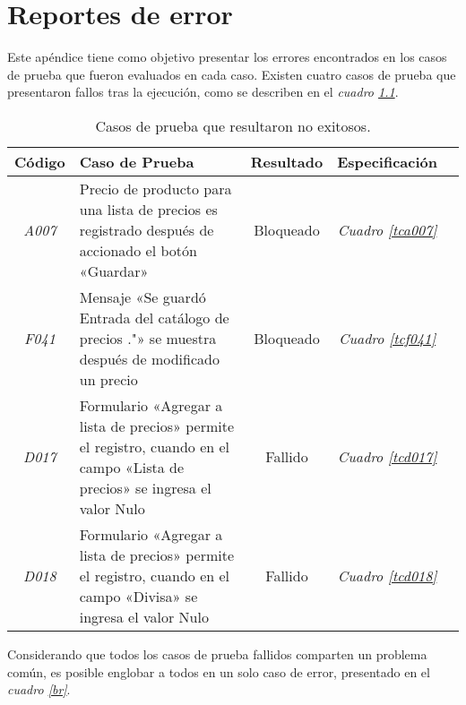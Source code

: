 \chapter{Reportes de error}
\label{appendix_bugreport}
Este apéndice tiene como objetivo presentar los errores encontrados en los casos
de prueba que fueron evaluados en cada caso. Existen cuatro casos de prueba que
presentaron fallos tras la ejecución, como se describen en el
\emph{cuadro \ref{bugs}}.

\begin{table}
\centering
\begin{tabular}{|c|p{6.5cm}|c|c|c|}
\hline
\footnotesize{\textbf{Código}} & \footnotesize{\textbf{Caso de Prueba}} &
\footnotesize{\textbf{Resultado}} & \footnotesize{\textbf{Especificación}} \\
\hline
\footnotesize{\emph{A007}} &
\footnotesize{Precio de producto para una lista de precios es registrado después
de accionado el botón «Guardar»} &
\footnotesize{Bloqueado} &
\footnotesize{\emph{Cuadro \ref{tca007}}}
\\
\footnotesize{\emph{F041}} &
\footnotesize{Mensaje «Se guardó Entrada del catálogo de precios ."» se muestra
después de modificado un precio} &
\footnotesize{Bloqueado} &
\footnotesize{\emph{Cuadro \ref{tcf041}}}
\\
\footnotesize{\emph{D017}} &
\footnotesize{Formulario «Agregar a lista de precios» permite el registro,
cuando en el campo «Lista de precios» se ingresa el valor Nulo} &
\footnotesize{Fallido} &
\footnotesize{\emph{Cuadro \ref{tcd017}}}
\\
\footnotesize{\emph{D018}} &
\footnotesize{Formulario «Agregar a lista de precios» permite el registro,
cuando en el campo «Divisa» se ingresa el valor Nulo} &
\footnotesize{Fallido} &
\footnotesize{\emph{Cuadro \ref{tcd018}}}
\\
\hline
\end{tabular}
\caption{Casos de prueba que resultaron no exitosos.}
\label{bugs}
\end{table}

Considerando que todos los casos de prueba fallidos comparten un problema común,
es posible englobar a todos en un solo caso de error, presentado en el
\emph{cuadro \ref{br}}.

